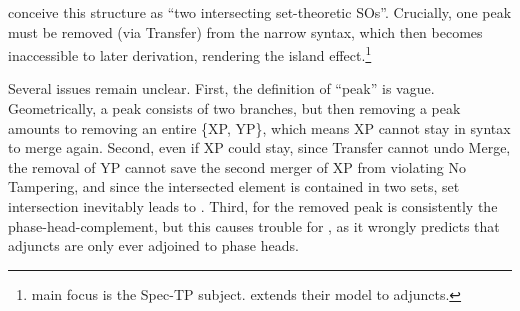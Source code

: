 \documentclass[output=paper]{langsci/langscibook}
\begin{document}
\ea\label{ex:peak}
\z

\noindent \citet[261]{EpsteinEtal2012} conceive this structure as ``two
intersecting set-theoretic \glspl{SO}''. Crucially, one peak must
be removed (via Transfer) from the narrow syntax, which then becomes
inaccessible to later derivation, rendering the island
effect.\footnote{ main focus is the Spec-TP
subject. \citeauthor{Oseki2015} extends their model to adjuncts.}

Several issues remain unclear. First, the definition of ``peak'' is vague.
Geometrically, a peak consists of two branches, but then removing a peak
amounts to removing an entire \{XP, YP\}, which means XP cannot stay in syntax
to merge again. Second, even if XP could stay, since Transfer cannot undo
Merge, the removal of YP cannot save the second merger of XP from violating No
Tampering, and since the intersected element is contained in two sets, set
intersection inevitably leads to . Third, for
\citeauthor{EpsteinEtal2012} the removed peak is consistently the
phase-head-complement, but this causes trouble for \citeauthor{Oseki2015}, as
it wrongly predicts that adjuncts are only ever adjoined to phase
heads.

\end{document}

